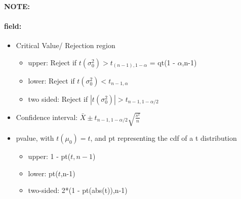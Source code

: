 \documentclass[12pt]{article}
\newenvironment{note}{\paragraph{NOTE:}}{}
\newenvironment{field}{\paragraph{field:}}{}
\begin{document}
\begin{note}
\begin{field}
\begin{itemize}
      \item Critical Value/ Rejection region
			      \begin{itemize}
				      \item upper: Reject if $t(\sigma_0^2) > t_{(n-1),1-\alpha}$ = qt(1 - $\alpha$,n-1)
              \item lower: Reject if $t(\sigma_0^2)  < t_{n-1,\alpha}$
              \item two sided: Reject if $|t(\sigma_0^2)| > t_{n-1, 1 - \alpha/2}$
            \end{itemize}
			\item Confidence interval: $\bar{X} \pm t_{n-1,1-\alpha/2}\sqrt{\frac{s^2}{n}}$
			\item pvalue, with $t(\mu_0)  = t$, and pt representing the cdf of a t distribution
			      \begin{itemize}
				      \item upper: 1 - pt($t,n-1$)
				      \item lower: pt($t$,n-1)
				      \item two-sided: 2*(1 - pt(abs(t)),n-1)
			      \end{itemize}
    \end{itemize}
  \end{field}
\end{note}
\end{document}
